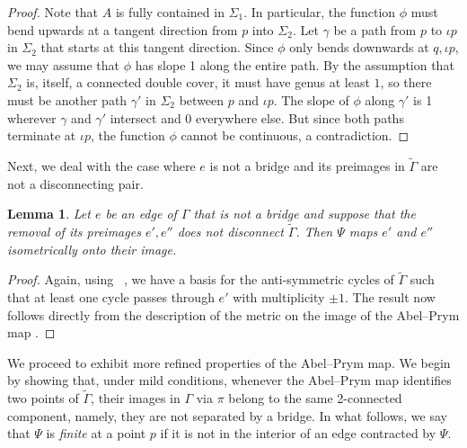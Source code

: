 \documentclass[11pt]{article}
\newtheorem{lemma}[theo]{Lemma}
\theoremstyle{definition}
\numberwithin{equation}{section}
\theoremstyle{definition}
\newcommand{\wt}[1]{\widetilde{#1}}
\begin{document}
\begin{proof}
Note that $A$ is fully contained in $\Sigma_1$.  
In particular, the function $\phi$ must bend upwards at a tangent direction from $p$ into $\Sigma_2$. Let $\gamma$ be a path from $p$ to $\iota p$ in $\Sigma_2$ that starts at this tangent direction. Since $\phi$ only bends downwards at $q, \iota p$, we may assume that $\phi$ has slope 1 along the entire path. 
By the assumption that $\Sigma_2$ is, itself, a connected double cover, it must have genus at least $1$, 
so there must be another path  $\gamma'$ in $\Sigma_2$ between $p$ and $\iota p$.
The  slope of $\phi$ along $\gamma'$ is 1 wherever $\gamma$ and $\gamma'$ intersect and 0 everywhere else. But since both paths terminate at $\iota p$, the function $\phi$ cannot be continuous, a contradiction. 
\end{proof}

Next, we deal with the case where $e$ is not a bridge and its preimages in $\wt\Gamma$ are not a disconnecting pair. 

\begin{lemma}\label{lem:notBridgeNotDisconnectingPair}
      Let $e$ be an edge of $\Gamma$ that is not a bridge  and suppose that the removal of its preimages  $e',e''$ does not disconnect $\wt\Gamma$.  
    Then $\Psi$ maps $e'$ and $e''$ isometrically onto their image. 
\end{lemma}
 
\begin{proof}
Again, using   ~\cite[Construction B]{LZ22}, we have a basis for the anti-symmetric cycles of $\wt\Gamma$ such that at least one cycle passes through $e'$ with multiplicity $\pm 1$. The result now follows directly from the description of the metric on the image of the Abel--Prym map .
\end{proof}

We proceed to exhibit more refined properties of the Abel--Prym map. We begin by showing that,  under mild conditions, whenever the Abel--Prym map identifies two points of $\wt\Gamma$, their images in $\Gamma$ via $\pi$ belong to the same  2-connected component, namely, they are not separated by a bridge. In what follows, we say that $\Psi$ is \emph{finite} at a point $p$ if it is not in the interior of an edge contracted by $\Psi$.  
\end{document}
